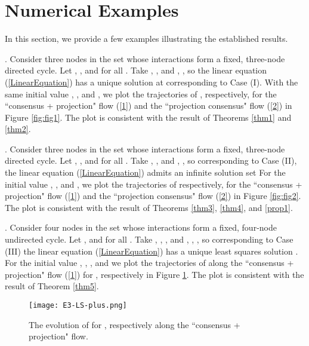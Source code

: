 \documentclass[a4paper, 11pt]{article}
\begin{document}
\section{Numerical Examples}\label{Sec:numerical}
In this section, we provide a few examples illustrating the established results.

\medskip

. Consider three nodes in the set  whose interactions form a fixed, three-node directed cycle. Let , , and  for all .  Take , ,  and , ,   so the linear equation (\ref{LinearEquation}) has a unique solution at  corresponding to Case (I). With the same initial value , , and , we plot the trajectories of , respectively, for the ``consensus + projection" flow (\ref{1}) and the ``projection consensus" flow (\ref{2}) in Figure \ref{fig:fig1}. The plot is consistent with the result of Theorems \ref{thm1} and \ref{thm2}.


\medskip

. Consider three nodes in the set  whose interactions form a fixed, three-node directed cycle.  Let , , and  for all .   Take , ,  and , ,   so corresponding to Case (II), the linear equation (\ref{LinearEquation}) admits an infinite solution set  
 For the initial value  , , and , we plot the trajectories of 
 respectively, for the ``consensus + projection" flow (\ref{1}) and the ``projection consensus" flow (\ref{2})  in Figure \ref{fig:fig2}. The plot is consistent with the result of Theorems \ref{thm3}, \ref{thm4}, and \ref{prop1}.


\medskip


. Consider four nodes in the set  whose interactions form a fixed, four-node undirected cycle.  Let ,  and  for all .   Take , , ,  and ,   , ,  so corresponding to Case (III) the linear equation (\ref{LinearEquation}) has  a unique least squares solution .
 For the initial value , , , and  we plot the trajectories of 
along  the ``consensus + projection" flow (\ref{1}) for , respectively in Figure \ref{fig:fig3}.   The plot is consistent with the result of Theorem \ref{thm5}.

\begin{figure}
\centering
\texttt{[image: E3-LS-plus.png]}
\caption{The evolution of   for , respectively along the ``consensus + projection" flow.}
\label{fig:fig3}
\end{figure}
\end{document}

